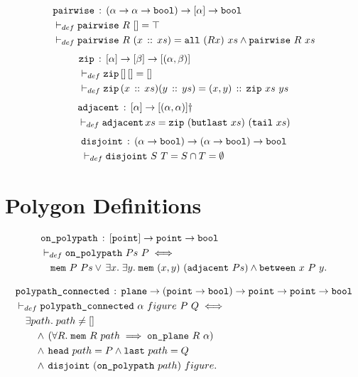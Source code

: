 \begin{align*}
  & \texttt{pairwise}\,:\,(\alpha \rightarrow \alpha \rightarrow \texttt{bool}) \rightarrow [\alpha] \rightarrow \texttt{bool}\\
  & \vdash_{def}\texttt{pairwise}\ R\ [] = \top\\
  & \vdash_{def}\texttt{pairwise}\ R\ (x\,::\,xs) = \texttt{all}\ (R x)\ xs \wedge \texttt{pairwise}\ R\ xs
\end{align*}
\begin{align*}
  & \texttt{zip}\,:\,[\alpha]\rightarrow[\beta]\rightarrow[(\alpha,\beta)]\\
  & \vdash_{def}\texttt{zip}\,[]\,[] = []\\
  & \vdash_{def}\texttt{zip}\,(x\,::\,xs)(y\,::\,ys) = (x,y)\,::\,\texttt{zip}\ xs\ ys
\end{align*}
\begin{align*}
  & \code{adjacent}\,:\,[\alpha]\rightarrow[(\alpha,\alpha)]\dag\\
  & \vdash_{def}\code{adjacent}\,xs = \code{zip}\ (\code{butlast}\ xs)\ (\code{tail}\ xs)
\end{align*}
\begin{align*}
  & \texttt{disjoint}\,:\,(\alpha\rightarrow\texttt{bool})\rightarrow(\alpha\rightarrow\texttt{bool})\rightarrow\texttt{bool}\\
  & \vdash_{def}\texttt{disjoint}\ S\ T = S \cap T = \emptyset
\end{align*}

\section{Polygon Definitions}
\begin{align*}
  &\code{on\_polypath}\,:\,[\code{point}] \rightarrow \code{point} \rightarrow \code{bool}\\
  &\vdash_{def}\code{on\_polypath}\ Ps\ P \iff\\
  &\quad\code{mem}\ P\ Ps\vee\,\exists x.\;\exists y.\; \code{mem}\ (x,y)\ (\code{adjacent}\ Ps) \wedge \between{x}{P}{y}.
\end{align*}

\begin{align*}
  &\code{polypath\_connected}\,:\,\code{plane}\rightarrow(\code{point} \rightarrow \code{bool}) \rightarrow \code{point} \rightarrow \code{point} \rightarrow \code{bool}\\
  &\vdash_{def}\code{polypath\_connected}\ \alpha\ figure\ P\ Q \iff\\
  &\quad\exists path.\; path \neq []\\
  &\qquad\wedge\,(\forall R.\;\code{mem}\ R\ path \implies \onplane{R}{\alpha})\\
  &\qquad\wedge\,\code{head}\ path = P \wedge \code{last}\ path = Q\\
  &\qquad\wedge\,\code{disjoint}\ (\code{on\_polypath}\ path)\ figure.
\end{align*}

